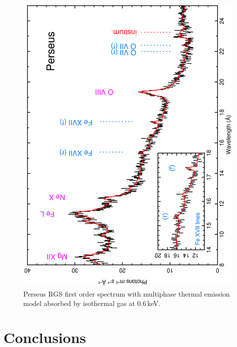 \documentclass[useAMS,usenatbib]{mn2e}
\begin{document}
{\begin{figure}
  \includegraphics[width=0.7\columnwidth, angle=-90,bb=80 63 540 675]{paper_ovii_fig04.ps}
   \caption{Perseus RGS first order spectrum with multiphase thermal emission model
   absorbed by isothermal gas at 0.6\,keV.} \label{Fig:Perseus}
\end{figure}

\section{Conclusions}
\label{sec:conclusion}

}
\end{document}
